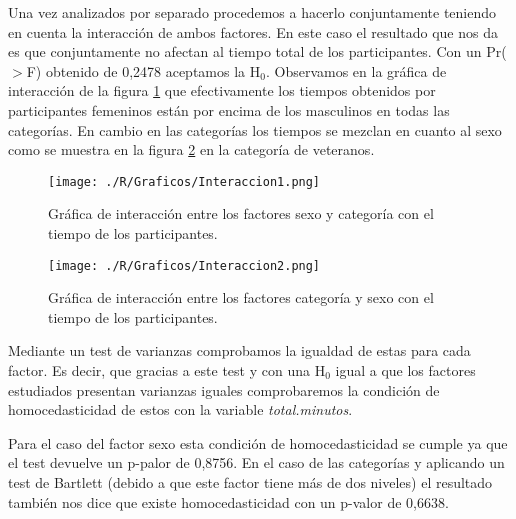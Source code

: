\documentclass[11pt,a4paper]{article}
\begin{document}
Una vez analizados por separado procedemos a hacerlo conjuntamente teniendo en cuenta la interacción de ambos factores. En este caso el resultado que nos da es que conjuntamente no afectan al tiempo total de los participantes. Con un Pr($>$F) obtenido de 0,2478 aceptamos la H$_{0}$. Observamos en la gráfica de interacción de la figura \ref{fig:interaccion1} que efectivamente los tiempos obtenidos por participantes femeninos están por encima de los masculinos en todas las categorías. En cambio en las categorías los tiempos se mezclan en cuanto al sexo como se muestra en la figura \ref{fig:interaccion2} en la categoría de veteranos.

\begin{figure}
\centering
\texttt{[image: ./R/Graficos/Interaccion1.png]}
\caption{Gráfica de interacción entre los factores sexo y categoría con el tiempo de los participantes.}
\label{fig:interaccion1}
\end{figure}

\begin{figure}
\centering
\texttt{[image: ./R/Graficos/Interaccion2.png]}
\caption{Gráfica de interacción entre los factores categoría y sexo con el tiempo de los participantes.}
\label{fig:interaccion2}
\end{figure}

Mediante un test de varianzas comprobamos la igualdad de estas para cada factor. Es decir, que gracias a este test y con una H$_{0}$ igual a que los factores estudiados presentan varianzas iguales comprobaremos la condición de homocedasticidad de estos con la variable \textit{total.minutos}.

Para el caso del factor sexo esta condición de homocedasticidad se cumple ya que el test devuelve un p-palor de 0,8756. En el caso de las categorías y aplicando un test de Bartlett (debido a que este factor tiene más de dos niveles) el resultado también nos dice que existe homocedasticidad con un p-valor de 0,6638.
\end{document}
